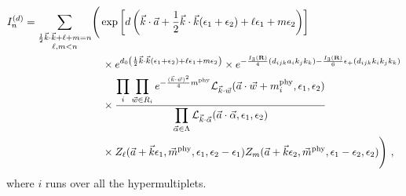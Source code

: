 \documentclass[letterpaper, 11pt]{article}
\def\CL{{\cal L}}
\def\a{\alpha}
\def\e{\epsilon}
\def\half{\frac{1}{2}}
\begin{document}
\begin{align}
\begin{split}
I_n^{(d)} = \sum_{\substack{\half \vec{k}\cdot\vec{k} + \ell + m = n \\ \ell, m < n}} & \Bigg( \exp \left[ d\left( \vec{k} \cdot \vec{a} + \half \vec{k} \cdot \vec{k} (\e_1 + \e_2) + \ell \e_1 + m \e_2 \right)\right]  \\& \quad
\times e^{d_0\left( \half \vec{k} \cdot \vec{k} (\e_1 + \e_2) + \ell \e_1 + m \e_2 \right)}  \times e^{- \frac{I_3(\mathbf{R})}{4} (d_{ijk} a_i k_j k_k ) - \frac{ I_3(\mathbf{R})}{6} \epsilon_+(d_{ijk} k_i k_j k_k )}\\
& \quad \times \frac{\displaystyle \prod_{i} \prod_{\vec{w} \in R_i} e^{-\frac{(\vec{k}\cdot \vec{w})^2}{4}m^{\textrm{phy}} } \CL_{\vec{k} \cdot \vec{w}} (\vec{a} \cdot \vec{w} + m^{\textrm{phy}}_i, \e_1, \e_2)}{\displaystyle \prod_{\vec{\a} \in \Lambda}  \CL_{\vec{k} \cdot \vec{\a}}(\vec{a} \cdot \vec{\a}, \e_1, \e_2)  }  \\
&\quad \times Z_{\ell}(\vec{a}+\vec{k}\e_1, \vec{m}^{\textrm{phy}}, \e_1, \e_2-\e_1) Z_m (\vec{a}+\vec{k} \e_2, \vec{m}^{\textrm{phy}}, \e_1-\e_2, \e_2) \Bigg) \ , 
\end{split}
\end{align}
where $i$ runs over all the hypermultiplets. 
\end{document}
